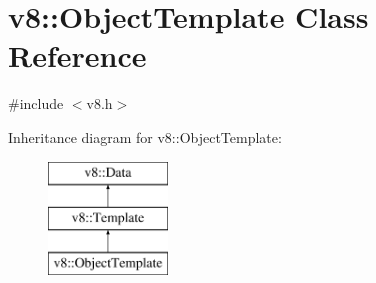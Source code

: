 \hypertarget{classv8_1_1ObjectTemplate}{}\section{v8\+:\+:Object\+Template Class Reference}
\label{classv8_1_1ObjectTemplate}


{\ttfamily \#include $<$v8.\+h$>$}

Inheritance diagram for v8\+:\+:Object\+Template\+:\begin{figure}[H]
\begin{center}
\leavevmode
\includegraphics[height=3.000000cm]{classv8_1_1ObjectTemplate}
\end{center}
\end{figure}
